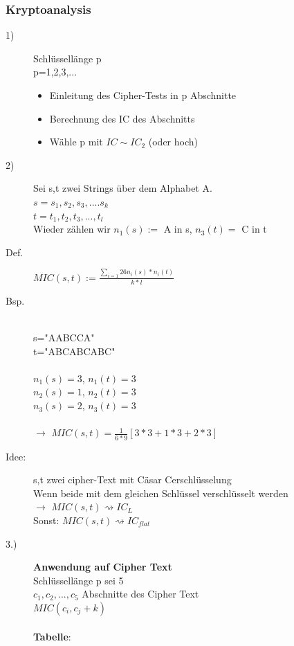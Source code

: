 \documentclass[10pt]{article}
\newcommand{\ra}{\rightarrow}
\begin{document}
\subsubsection{Kryptoanalysis}
\begin{description}
	\item[1)] Schlüssellänge p\\
		p=1,2,3,...
		\begin{itemize}
			\item Einleitung des Cipher-Tests in p Abschnitte
			\item Berechnung des IC des Abschnitts
			\item Wähle p mit $IC\sim IC_2$ (oder hoch)
		\end{itemize}
	\item[2)] Sei s,t zwei  Strings über dem Alphabet A. \\
		$s=s_1,s_2,s_3, .... s_k$ \\
		$t=t_1,t_2,t_3, ..., t_l$ \\
		Wieder zählen wir $n_1(s) :=$ A in s, $n_3(t)=$ C in t
	\item[Def.] $MIC(s,t):=\frac{\sum_{i=1}{26}n_i(s)*n_i(t)}{k*l}$ \\
	\item[Bsp.] \hfill \\
		s="{}AABCCA" \\
		t="ABCABCABC" \\
		\\
		$n_1(s)=3$, $n_1(t)=3$ \\
		$n_2(s)=1$, $n_2(t)=3$ \\
		$n_3(s)=2$, $n_3(t)=3$ \\ \\
		$\ra$ $MIC(s,t)=\frac{1}{6*9}[3*3+1*3+2*3]$
	\item[Idee:] s,t zwei cipher-Text mit Cäsar Cerschlüsselung \\
		Wenn beide mit dem gleichen Schlüssel verschlüsselt werden \\
		$\ra$ $MIC(s,t)\rightsquigarrow IC_L$ \\
		Sonst: $MIC(s,t)\rightsquigarrow IC_{flat}$
	\item[3.)] \textbf{Anwendung auf Cipher Text} \\
		Schlüssellänge p sei 5 \\
		$c_1,c_2, ...,c_5$ Abschnitte des Cipher Text \\
		$MIC(c_i,c_j+k)$ \\ \\
		\textbf{Tabelle}:  \\

\end{description}
\end{document}
